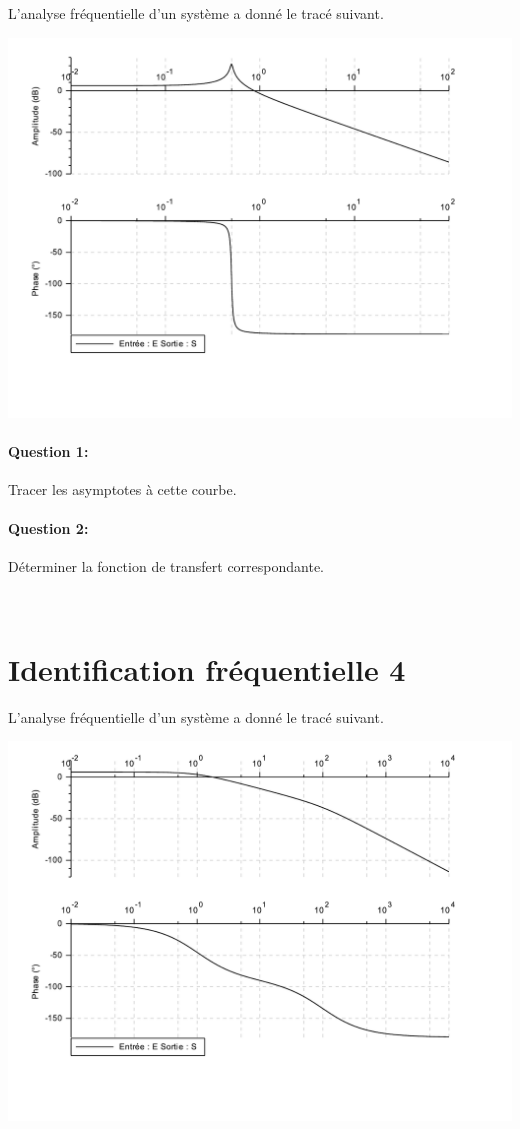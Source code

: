 L'analyse fréquentielle d'un système a donné le tracé suivant.

\begin{center}
 \includegraphics[width=0.8\linewidth]{img/Bode3}
\end{center} 

\paragraph{Question 1:} Tracer les asymptotes à cette courbe.

\paragraph{Question 2:} Déterminer la fonction de transfert correspondante.

\newpage ~\ \newpage

\section{Identification fréquentielle 4}

L'analyse fréquentielle d'un système a donné le tracé suivant.

\begin{center}
 \includegraphics[width=0.8\linewidth]{img/Bode4}
\end{center} 

